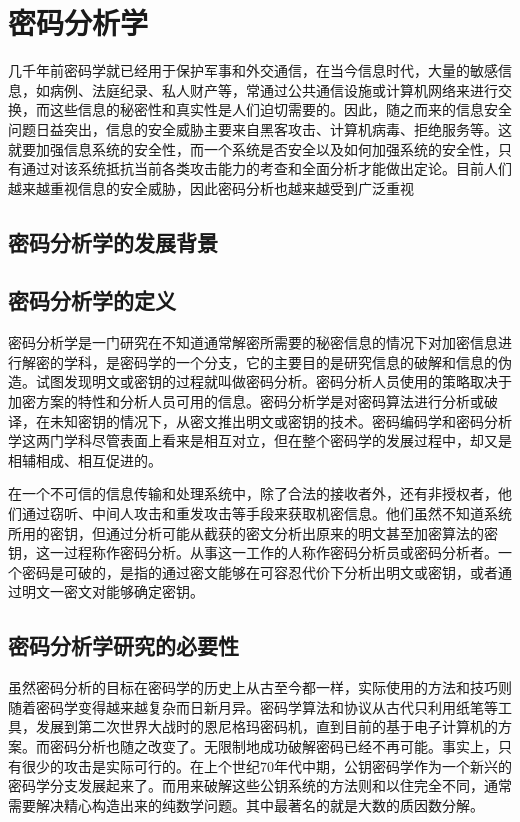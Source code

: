\chapter{密码分析学}
几千年前密码学就已经用于保护军事和外交通信，在当今信息时代，大量的敏感信息，如病例、法庭纪录、私人财产等，常通过公共通信设施或计算机网络来进行交换，而这些信息的秘密性和真实性是人们迫切需要的。因此，随之而来的信息安全问题日益突出，信息的安全威胁主要来自黑客攻击、计算机病毒、拒绝服务等。这就要加强信息系统的安全性，而一个系统是否安全以及如何加强系统的安全性，只有通过对该系统抵抗当前各类攻击能力的考查和全面分析才能做出定论。目前人们越来越重视信息的安全威胁，因此密码分析也越来越受到广泛重视
\section{密码分析学的发展背景}
\section{密码分析学的定义}
密码分析学是一门研究在不知道通常解密所需要的秘密信息的情况下对加密信息进行解密的学科，是密码学的一个分支，它的主要目的是研究信息的破解和信息的伪造。试图发现明文或密钥的过程就叫做密码分析。密码分析人员使用的策略取决于加密方案的特性和分析人员可用的信息。密码分析学是对密码算法进行分析或破译，在未知密钥的情况下，从密文推出明文或密钥的技术。密码编码学和密码分析学这两门学科尽管表面上看来是相互对立，但在整个密码学的发展过程中，却又是相辅相成、相互促进的。

在一个不可信的信息传输和处理系统中，除了合法的接收者外，还有非授权者，他们通过窃听、中间人攻击和重发攻击等手段来获取机密信息。他们虽然不知道系统所用的密钥，但通过分析可能从截获的密文分析出原来的明文甚至加密算法的密钥，这一过程称作密码分析\cite{feng01}。从事这一工作的人称作密码分析员或密码分析者。一个密码是可破的，是指的通过密文能够在可容忍代价下分析出明文或密钥，或者通过明文一密文对能够确定密钥。
\section{密码分析学研究的必要性}
虽然密码分析的目标在密码学的历史上从古至今都一样，实际使用的方法和技巧则随着密码学变得越来越复杂而日新月异。密码学算法和协议从古代只利用纸笔等工具，发展到第二次世界大战时的恩尼格玛密码机，直到目前的基于电子计算机的方案。而密码分析也随之改变了。无限制地成功破解密码已经不再可能。事实上，只有很少的攻击是实际可行的。在上个世纪70年代中期，公钥密码学作为一个新兴的密码学分支发展起来了。而用来破解这些公钥系统的方法则和以住完全不同，通常需要解决精心构造出来的纯数学问题。其中最著名的就是大数的质因数分解。

